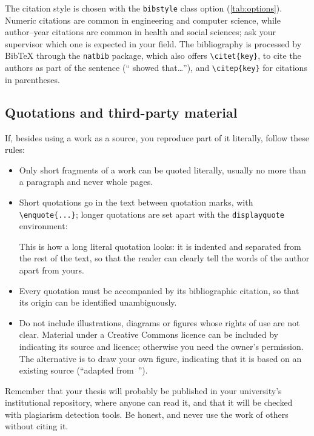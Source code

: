 The citation style is chosen with the \texttt{bibstyle} class option
(\autoref{tab:options}). Numeric citations are common in engineering and computer science,
while author--year citations are common in health and social sciences; ask your supervisor
which one is expected in your field. The bibliography is processed by BibTeX through the
\texttt{natbib} package, which also offers \verb|\citet{key}|, to cite the authors as part
of the sentence (\enquote{\citet{pedregosa2011scikit} showed that\dots}), and
\verb|\citep{key}| for citations in parentheses.

\subsection{Quotations and third-party material}\label{sec:quotes}

If, besides using a work as a source, you reproduce part of it literally, follow these
rules:

\begin{itemize}
  \item Only short fragments of a work can be quoted literally, usually no more than a
        paragraph and never whole pages.
  \item Short quotations go in the text between quotation marks, with \verb|\enquote{...}|;
        longer quotations are set apart with the \texttt{displayquote} environment:
        \begin{displayquote}
          This is how a long literal quotation looks: it is indented and separated from the
          rest of the text, so that the reader can clearly tell the words of the author
          apart from yours.~\cite{charte2020review}
        \end{displayquote}
  \item Every quotation must be accompanied by its bibliographic citation, so that its
        origin can be identified unambiguously.
  \item Do not include illustrations, diagrams or figures whose rights of use are not
        clear. Material under a Creative Commons licence can be included by indicating its
        source and licence; otherwise you need the owner's permission. The alternative is
        to draw your own figure, indicating that it is based on an existing source
        (\enquote{adapted from~\cite{herrera2016multilabel}}).
\end{itemize}

Remember that your thesis will probably be published in your university's institutional
repository, where anyone can read it, and that it will be checked with plagiarism detection
tools. Be honest, and never use the work of others without citing it.

